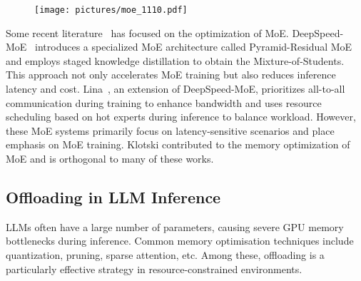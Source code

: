 \begin{figure}[t]
  \centering
  \texttt{[image: pictures/moe\_1110.pdf]}
  \caption{}
  \label{figure:2}
\end{figure}

Some recent literature~\cite{zhai2023smartmoe, he2022fastermoe, rajbhandari2022deepspeed, li2023accelerating} has focused on the optimization of MoE. DeepSpeed-MoE~\cite{rajbhandari2022deepspeed} introduces a specialized MoE architecture called Pyramid-Residual MoE and employs staged knowledge distillation to obtain the Mixture-of-Students. This approach not only accelerates MoE training but also reduces inference latency and cost. Lina~\cite{li2023accelerating}, an extension of DeepSpeed-MoE, prioritizes all-to-all communication during training to enhance bandwidth and uses resource scheduling based on hot experts during inference to balance workload. However, these MoE systems primarily focus on latency-sensitive scenarios and place emphasis on MoE training. Klotski contributed to the memory optimization of MoE and is orthogonal to many of these works.

\subsection{Offloading in LLM Inference}
\label{section:2.2}
LLMs often have a large number of parameters, causing severe GPU memory bottlenecks during inference. Common memory optimisation techniques include quantization, pruning, sparse attention, etc. Among these, offloading is a particularly effective strategy in resource-constrained environments. 

